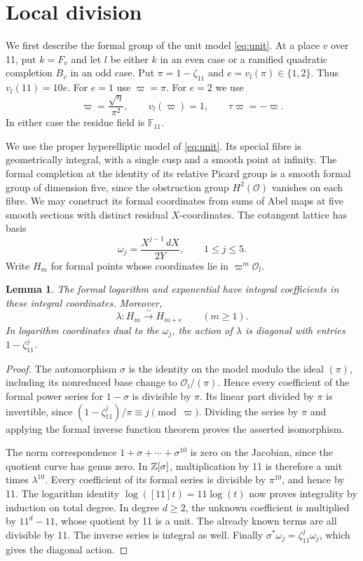 \documentclass[11pt,reqno]{amsart}
\newcommand{\F}{\mathbb F}\newcommand{\OO}{\mathcal O}
\newtheorem{lemma}[theorem]{Lemma}
\theoremstyle{definition}\newtheorem{definition}[theorem]{Definition}
\theoremstyle{remark}\newtheorem{remark}[theorem]{Remark}
\numberwithin{equation}{section}
\begin{document}
\section{Local division}\label{sec:local}

We first describe the formal group of the unit model \eqref{eq:unit}.
At a place \(v\) over 11, put \(k=F_v\) and let \(l\) be either \(k\) in an even case
or a ramified quadratic completion \(B_v\) in an odd case.
Put \(\pi=1-\zeta_{11}\) and \(e=v_l(\pi)\in\{1,2\}\).
Thus \(v_l(11)=10e\). For \(e=1\) use \(\varpi=\pi\).
For \(e=2\) we use
\[
 \varpi=\frac{\sqrt\eta}{\pi^2},\qquad
 v_l(\varpi)=1,\qquad \tau\varpi=-\varpi.
\]
In either case the residue field is \(\F_{11}\).

We use the proper hyperelliptic model of \eqref{eq:unit}. Its special
fibre is geometrically integral, with a single cusp and a smooth point
at infinity. The formal completion at the identity of its relative
Picard group is a smooth formal group of dimension five, since the
obstruction group \(H^2(\mathcal O)\) vanishes on each fibre. We may
construct its formal coordinates from sums of Abel maps at five smooth
sections with distinct residual \(X\)-coordinates. The cotangent lattice
has basis
\[
 \omega_j=\frac{X^{j-1}\,dX}{2Y},\qquad 1\le j\le5.
\]
Write \(H_m\) for formal points whose coordinates lie in
\(\varpi^m\OO_l\).

\begin{lemma}\label{lem:log}
The formal logarithm and exponential have integral coefficients in
these integral coordinates. Moreover,
\[
 \lambda:H_m\xrightarrow{\sim}H_{m+e}\qquad(m\ge1).
\]
In logarithm coordinates dual to the \(\omega_j\), the action of
\(\lambda\) is diagonal with entries \(1-\zeta_{11}^j\).
\end{lemma}
\begin{proof}
The automorphism \(\sigma\) is the identity on the model modulo the
ideal \((\pi)\), including its nonreduced base change to
\(\OO_l/(\pi)\). Hence every coefficient of the formal power series
for \(1-\sigma\) is divisible by \(\pi\). Its linear part divided by
\(\pi\) is invertible, since
\((1-\zeta_{11}^j)/\pi\equiv j\pmod\varpi\).
Dividing the series by \(\pi\) and applying the formal inverse
function theorem proves the asserted isomorphism.

The norm correspondence \(1+\sigma+\cdots+\sigma^{10}\) is zero on
the Jacobian, since the quotient curve has genus zero. In
\(\mathbb Z[\sigma]\), multiplication by 11 is therefore a unit times
\(\lambda^{10}\). Every coefficient of its formal series is divisible
by \(\pi^{10}\), and hence by 11.
The logarithm identity
\(\log([11]t)=11\log(t)\) now proves integrality by induction on total
degree. In degree \(d\ge2\), the unknown coefficient is multiplied
by \(11^d-11\), whose quotient by 11 is a unit. The already known
terms are all divisible by 11. The inverse series is integral as well.
Finally \(\sigma^*\omega_j=\zeta_{11}^j\omega_j\), which gives the
diagonal action.
\end{proof}
\end{document}
